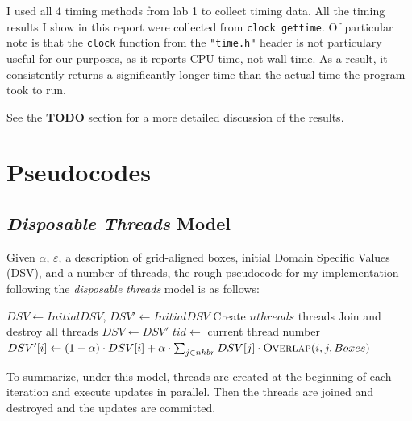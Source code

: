 \documentclass{article}
\begin{document}
I used all 4 timing methods from lab 1 to collect timing data. All the timing
results I show in this report were collected from \texttt{clock\textunderscore
gettime}. Of particular note is that the \texttt{clock} function from the
\texttt{"time.h"} header is not particulary useful for our purposes, as it
reports CPU time, not wall time. As a result, it consistently returns a
significantly longer time than the actual time the program took to run.

See the \textbf{TODO} section for a more detailed discussion of the results.

\newpage
\section*{Pseudocodes}
\label{sec:pseudocoes}

\subsection*{\emph{Disposable Threads} Model}

Given $\alpha$, $\varepsilon$, a description of grid-aligned boxes, initial
Domain Specific Values (DSV), and a number of threads, the rough pseudocode for
my implementation following the \emph{disposable threads} model is as follows:

\begin{algorithm}
\begin{algorithmic}[1]
\State $DSV \gets Initial DSV$, $DSV' \gets Initial DSV$
 \label{alg:amr:convergence}
    \State Create $nthreads$ threads
        \State {}
    \EndFor
    \State Join and destroy all threads
    \State $DSV \gets DSV'$ \label{alg:amr:commit}
\EndWhile
\EndProcedure
{}
    \State $tid \gets$ current thread number
        \State $DSV'[i] \gets (1 - \alpha)\cdot DSV[i] + \alpha \cdot \sum_{j\in nhbr} DSV[j]\cdot \Call{Overlap}{i, j, Boxes}$
    \EndFor
\EndProcedure
\end{algorithmic}
\end{algorithm}

To summarize, under this model, threads are created at the beginning of each
iteration and execute updates in parallel. Then the threads are joined and
destroyed and the updates are committed.
\end{document}
